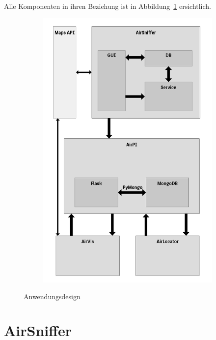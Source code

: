 \documentclass[11pt,a4paper]{article}
\begin{document}
Alle Komponenten in ihren Beziehung ist in Abbildung~\ref{fig:Anwendungsdesign} ersichtlich.

\begin{figure}[htbp]
    \centering
    \begin{subfigure}[b]{1\textwidth}
        \includegraphics[width=\textwidth]{pics/AirAndwenungsdesign.png}
    \end{subfigure}
    \caption{Anwendungsdesign}\label{fig:Anwendungsdesign}
\end{figure}

\newpage
\section{AirSniffer}
\end{document}
